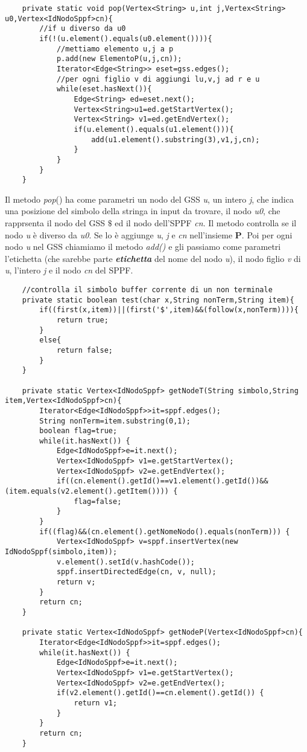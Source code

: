 \begin{lstlisting}
	private static void pop(Vertex<String> u,int j,Vertex<String> u0,Vertex<IdNodoSppf>cn){
		//if u diverso da u0
		if(!(u.element().equals(u0.element()))){
			//mettiamo elemento u,j a p
			p.add(new ElementoP(u,j,cn));
			Iterator<Edge<String>> eset=gss.edges();
			//per ogni figlio v di aggiungi lu,v,j ad r e u
			while(eset.hasNext()){
				Edge<String> ed=eset.next();
				Vertex<String>u1=ed.getStartVertex();
				Vertex<String> v1=ed.getEndVertex();
				if(u.element().equals(u1.element())){
					add(u1.element().substring(3),v1,j,cn);
				}
			}
		}
	}
\end{lstlisting}
Il metodo \textit{pop}() ha come parametri un nodo del GSS \textit{u}, un intero \textit{j}, che indica una posizione del simbolo della stringa in input da trovare, il nodo \textit{u0}, che rapprsenta il nodo del GSS $\$$ ed il nodo dell'SPPF \textit{cn}. Il metodo controlla se il nodo \textit{u} è diverso da \textit{u0}. Se lo è aggiunge \textit{u}, \textit{j} e \textit{cn} nell'insieme \textbf{P}. Poi per ogni nodo \textit{u} nel GSS chiamiamo il metodo \textit{add()} e gli passiamo come parametri l'etichetta (che sarebbe parte \textit{\textbf{etichetta}} del nome del nodo \textit{u}), il nodo figlio \textit{v} di \textit{u}, l'intero \textit{j} e il nodo \textit{cn}  del SPPF.
\begin{lstlisting}
	//controlla il simbolo buffer corrente di un non terminale 
	private static boolean test(char x,String nonTerm,String item){
		if((first(x,item))||(first('$',item)&&(follow(x,nonTerm)))){
			return true;
		}
		else{
			return false;
		}
	}
	
	private static Vertex<IdNodoSppf> getNodeT(String simbolo,String item,Vertex<IdNodoSppf>cn){
		Iterator<Edge<IdNodoSppf>>it=sppf.edges();
		String nonTerm=item.substring(0,1);
		boolean flag=true;
		while(it.hasNext()) {
			Edge<IdNodoSppf>e=it.next();
			Vertex<IdNodoSppf> v1=e.getStartVertex();
			Vertex<IdNodoSppf> v2=e.getEndVertex();
			if((cn.element().getId()==v1.element().getId())&&(item.equals(v2.element().getItem()))) {
				flag=false;
			}
		}
		if((flag)&&(cn.element().getNomeNodo().equals(nonTerm))) {
			Vertex<IdNodoSppf> v=sppf.insertVertex(new IdNodoSppf(simbolo,item));
			v.element().setId(v.hashCode());
			sppf.insertDirectedEdge(cn, v, null);
			return v;
		}
		return cn;
	}
	
	private static Vertex<IdNodoSppf> getNodeP(Vertex<IdNodoSppf>cn){
		Iterator<Edge<IdNodoSppf>>it=sppf.edges();
		while(it.hasNext()) {
			Edge<IdNodoSppf>e=it.next();
			Vertex<IdNodoSppf> v1=e.getStartVertex();
			Vertex<IdNodoSppf> v2=e.getEndVertex();
			if(v2.element().getId()==cn.element().getId()) {
				return v1;
			}
		}
		return cn;
	}
	
\end{lstlisting}
